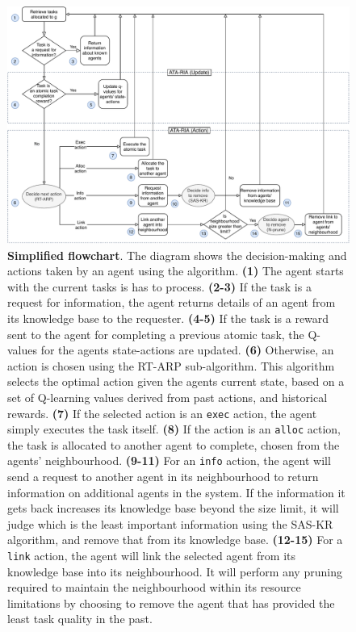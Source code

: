\begin{figure}[ht]
	\centering
	\includegraphics[width=0.8\linewidth, trim={65pt 0pt 65pt 0pt, clip}]{ataria-simplified}
	\caption{\textbf{Simplified \acronymATARIA{}{} flowchart}. The diagram shows the decision-making and actions taken by an agent using the \acronymATARIA{}{}  algorithm. \newline
		\textbf{(1)} The agent starts with the current tasks is has to process. \newline
		\textbf{(2-3)} If the task is a request for information, the agent returns details of an agent from its knowledge base to the requester. \newline
		\textbf{(4-5)} If the task is a reward sent to the agent for completing a previous atomic task, the Q-values for the agents state-actions are updated. \newline
		\textbf{(6)} Otherwise, an action is chosen using the RT-ARP sub-algorithm. This algorithm selects the optimal action given the agents current state, based on a set of Q-learning values derived from past actions, and historical rewards.  \newline
		\textbf{(7)} If the selected action is an \texttt{exec} action, the agent simply executes the task itself. \newline
		\textbf{(8)} If the action is an \texttt{alloc} action, the task is allocated to another agent to complete, chosen from the agents' neighbourhood. \newline
		\textbf{(9-11)} For an \texttt{info} action, the agent will send a request to another agent in its neighbourhood to return information on additional agents in the system. If the information it gets back increases its knowledge base beyond the size limit, it will judge which is the least important information using the SAS-KR algorithm, and remove that from its knowledge base. \newline
		\textbf{(12-15)} For a \texttt{link} action, the agent will link the selected agent from its knowledge base into its neighbourhood. It will perform any pruning required to maintain the neighbourhood within its resource limitations by choosing to remove the agent that has provided the least task quality in the past. \newline
}
	\label{fig:ataria-simplified}
\end{figure}

